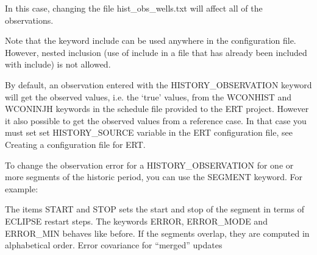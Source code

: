 \documentclass[a4paper,10pt,english]{sphinxmanual}
\begin{document}
In this case, changing the file hist\_obs\_wells.txt will affect all of
the observations.

Note that the keyword include can be used anywhere in the
configuration file. However, nested inclusion (use of include in a
file that has already been included with include) is not allowed.

By default, an observation entered with the HISTORY\_OBSERVATION
keyword will get the observed values, i.e. the ‘true’ values, from the
WCONHIST and WCONINJH keywords in the schedule file provided to the
ERT project. However it also possible to get the observed values from
a reference case. In that case you must set set HISTORY\_SOURCE
variable in the ERT configuration file, see Creating a configuration
file for ERT.

To change the observation error for a HISTORY\_OBSERVATION for one or
more segments of the historic period, you can use the SEGMENT
keyword. For example:

%
\begin{sphinxVerbatim}[commandchars=\\\{\}]
 
           
      
       

    
        
         
        
        

    
             
              
            
        
\end{sphinxVerbatim}

The items START and STOP sets the start and stop of the segment in
terms of ECLIPSE restart steps. The keywords ERROR, ERROR\_MODE and
ERROR\_MIN behaves like before. If the segments overlap, they are
computed in alphabetical order.  Error covariance for “merged” updates
\end{document}
